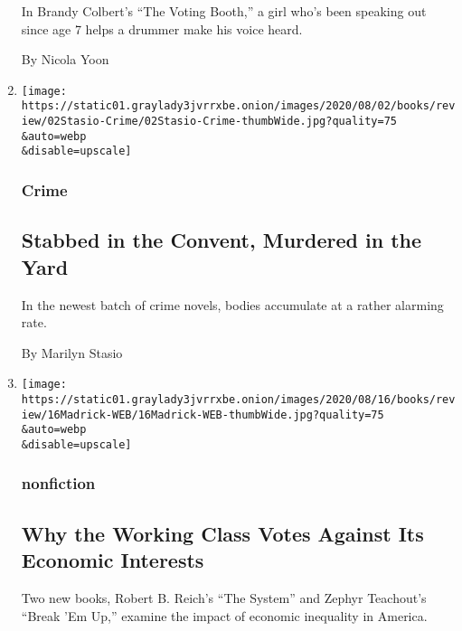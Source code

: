 \begin{enumerate}
  In Brandy Colbert's ``The Voting Booth,'' a girl who's been speaking
  out since age 7 helps a drummer make his voice heard.

  By Nicola Yoon
\item
  \href{/2020/07/31/books/review/crime-fiction-megan-miranda.html}{}

  \texttt{[image: https://static01.graylady3jvrrxbe.onion/images/2020/08/02/books/review/02Stasio-Crime/02Stasio-Crime-thumbWide.jpg?quality=75\\\&auto=webp\\\&disable=upscale]}

  \hypertarget{crime}{%
  \subsubsection{Crime}\label{crime}}

  \hypertarget{stabbed-in-the-convent-murdered-in-the-yard}{%
  \subsection{Stabbed in the Convent, Murdered in the
  Yard}\label{stabbed-in-the-convent-murdered-in-the-yard}}

  In the newest batch of crime novels, bodies accumulate at a rather
  alarming rate.

  By Marilyn Stasio
\item
  \href{/2020/07/31/books/review/the-system-robert-reich-break-em-up-zephyr-teachout.html}{}

  \texttt{[image: https://static01.graylady3jvrrxbe.onion/images/2020/08/16/books/review/16Madrick-WEB/16Madrick-WEB-thumbWide.jpg?quality=75\\\&auto=webp\\\&disable=upscale]}

  \hypertarget{nonfiction-2}{%
  \subsubsection{nonfiction}\label{nonfiction-2}}

  \hypertarget{why-the-working-class-votes-against-its-economic-interests}{%
  \subsection{Why the Working Class Votes Against Its Economic
  Interests}\label{why-the-working-class-votes-against-its-economic-interests}}

  Two new books, Robert B. Reich's ``The System'' and Zephyr Teachout's
  ``Break 'Em Up,'' examine the impact of economic inequality in
  America.


\end{enumerate}
